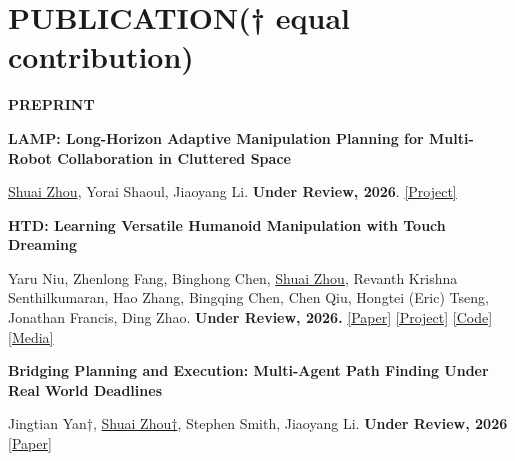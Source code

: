 \documentclass[a4paper,9pt]{extarticle}
\begin{document}
\section*{{\textbf{\fontsize{14pt}{8pt}\selectfont P}\textbf{\scshape UBLICATION}}(† equal contribution)}
{\textbf{\fontsize{12pt}{4pt}\selectfont P}\textbf{\scshape REPRINT}}
\begin{enumerate}[label={[\arabic*]}, leftmargin=2em]
\item \textbf{LAMP: Long-Horizon Adaptive Manipulation Planning for Multi-Robot Collaboration in Cluttered Space}
\par\textup{\underline{Shuai Zhou}, Yorai Shaoul, Jiaoyang Li.  \textbf{Under Review, 2026}.  \href{https://multi-robot-lamp.github.io/}{[Project]}}
\item \textbf{HTD: Learning Versatile Humanoid Manipulation with Touch Dreaming}
\par\textup{Yaru Niu, Zhenlong Fang, Binghong Chen, \underline{Shuai Zhou}, Revanth Krishna Senthilkumaran, Hao Zhang, Bingqing Chen, Chen Qiu, Hongtei (Eric) Tseng, Jonathan Francis, Ding Zhao. \textbf{Under Review, 2026.} \href{https://arxiv.org/abs/2604.13015}{[Paper]} \href{https://humanoid-touch-dream.github.io/}{[Project]} \href{https://github.com/chrisyrniu/humanoid-touch-dream}{[Code]} 
\href{https://spectrum.ieee.org/video-friday-humanoid-robot-production}{[Media]}}
\item \textbf{Bridging Planning and Execution: Multi-Agent Path Finding Under Real World Deadlines}
\par\textup{Jingtian Yan†, \underline{Shuai Zhou†}, Stephen Smith, Jiaoyang Li. \textbf{Under Review, 2026} \href{https://arxiv.org/abs/2511.21886}{[Paper]}}
\end{enumerate}
\end{document}
